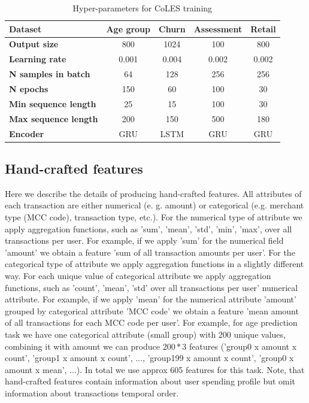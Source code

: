 \documentclass[sigconf]{acmart}
\begin{document}
\begin{table}
\centering
\caption{Hyper-parameters for CoLES training}
\begin{tabularx}{\linewidth}{Xcccc}
\toprule
\textbf{Dataset} & \textbf{Age group} & \textbf{Churn} & \textbf{Assessment} & \textbf{Retail} \\
\midrule
\textbf{Output size} & 800 & 1024 & 100 & 800 \\
\textbf{Learning rate} & 0.001 & 0.004 & 0.002 & 0.002 \\
\textbf{N samples in batch} & 64 & 128 & 256 & 256 \\
\textbf{N epochs} & 150 & 60 & 100 & 30 \\
\textbf{Min sequence length} & 25 & 15 & 100 & 30 \\
\textbf{Max sequence length} & 200 & 150 & 500 & 180 \\
\textbf{Encoder} & GRU & LSTM & GRU & GRU \\
\bottomrule
\end{tabularx}
\label{tab-hyper}
\end{table}

\subsection{Hand-crafted features} \label{app-sec-hand}

Here we describe the details of producing hand-crafted features. All attributes of each transaction are either numerical (e. g. amount) or categorical (e.g. merchant type (MCC code), transaction type, etc.). 
For the numerical type of attribute we apply aggregation functions, such as 'sum', 'mean', 'std', 'min', 'max', over all transactions per user. For example, if we apply 'sum' for the numerical field 'amount' we obtain a feature 'sum of all transaction amounts per user'. 
For the categorical type of attribute we apply aggregation functions in a slightly different way. For each unique value of categorical attribute we apply aggregation functions, such as 'count', 'mean', 'std' over all transactions per user' numerical attribute. For example, if we apply 'mean' for the numerical attribute 'amount' grouped by categorical attribute 'MCC code' we obtain a feature 'mean amount of all transactions for each MCC code per user'. 
For example, for age prediction task we have one categorical attribute (small group) with 200 unique values, combining it with amount we can produce $200 * 3$ features ('group0 x amount x count',  'group1 x amount x count', ..., 'group199 x amount x count', 'group0 x amount x mean', ...). In total we use approx 605 features for this task. %
Note, that hand-crafted features contain information about user spending profile but omit information about transactions temporal order.
\end{document}
